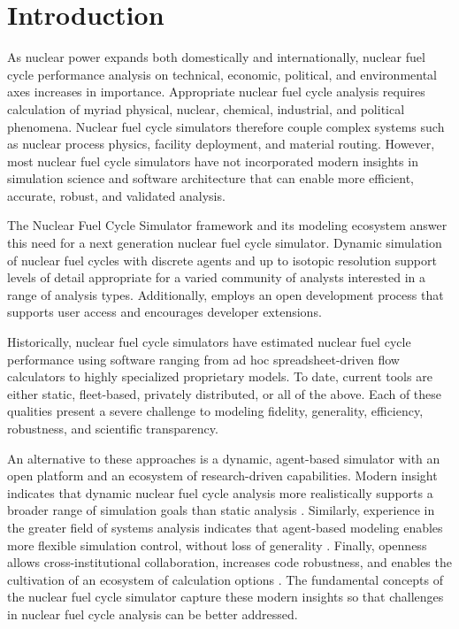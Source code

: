 
\section{Introduction}



As nuclear power expands both domestically and internationally, nuclear fuel cycle
performance analysis on technical, economic, political, and environmental axes increases 
in importance. Appropriate nuclear fuel cycle analysis requires calculation of myriad physical, nuclear, 
chemical, industrial, and political phenomena. Nuclear fuel cycle simulators 
therefore couple complex systems such as nuclear process physics, 
facility deployment, and material routing. However, most nuclear fuel cycle 
simulators have not incorporated modern insights in simulation science and 
software architecture that can enable more efficient, accurate, robust, and 
validated analysis. 

The \Cyclus Nuclear Fuel Cycle Simulator framework and 
its modeling ecosystem answer this need for a next generation nuclear fuel cycle 
simulator. Dynamic simulation of nuclear fuel cycles with discrete agents 
and up to isotopic resolution support 
levels of detail appropriate for a varied community of analysts
interested in a range of analysis types. Additionally, \Cyclus employs an 
open development process that supports user access and 
encourages developer extensions.

Historically, nuclear fuel cycle simulators have estimated 
nuclear fuel cycle performance using software 
ranging from ad hoc spreadsheet-driven flow calculators to highly specialized 
proprietary models. To date, current tools are either static, fleet-based, 
privately distributed, or all of the above. Each of these qualities present a 
severe challenge to modeling fidelity, generality, efficiency, robustness, and 
scientific transparency. 

An alternative to these approaches is a dynamic, agent-based simulator with an 
open platform and an ecosystem of research-driven capabilities.  Modern 
insight indicates that dynamic nuclear fuel cycle analysis more realistically 
supports a broader range of simulation goals than static analysis 
\cite{piet_dynamic_2011}. Similarly, experience in the greater field of systems 
analysis indicates that agent-based modeling enables more flexible simulation 
control, without loss of generality \cite{macal_agent-based_2010}. Finally, openness 
allows cross-institutional collaboration, increases code robustness, and 
enables the cultivation of an ecosystem of calculation options 
\cite{softwarecarpentryresource}.  The fundamental concepts of the \Cyclus 
nuclear fuel cycle simulator capture these modern insights so that challenges 
in nuclear fuel cycle analysis can be better addressed. 

